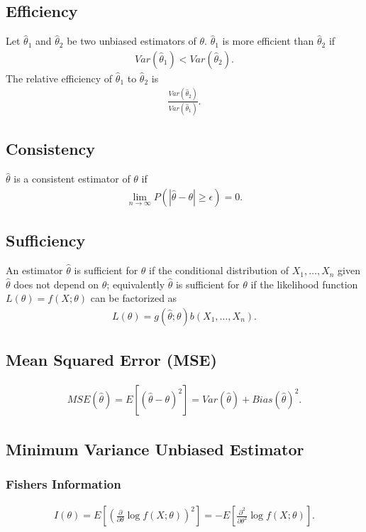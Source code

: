 \documentclass{article}
\begin{document}
\subsection{Efficiency}
Let $\hat{\theta}_1$ and $\hat{\theta}_2$ be two unbiased estimators of $\theta$. 
$\hat{\theta}_1$ is more efficient than $\hat{\theta}_2$ if
\begin{align*}
    Var(\hat{\theta}_1) < Var(\hat{\theta}_2).
\end{align*}
The relative efficiency of $\hat{\theta}_1$ to $\hat{\theta}_2$ is
\begin{align*}
    \frac{Var(\hat{\theta}_2)}{Var(\hat{\theta}_1)}.
\end{align*}

\subsection{Consistency}
$\hat{\theta}$ is a consistent estimator of $\theta$ if
\begin{align*}
    \lim_{n\rightarrow\infty}P(|\hat{\theta}-\theta|\ge\epsilon) = 0.
\end{align*}

\subsection{Sufficiency}
An estimator $\hat{\theta}$ is sufficient for $\theta$ if the conditional distribution of $X_1,\dots,X_n$ given $\hat{\theta}$ does not depend on $\theta$;
equivalently $\hat{\theta}$ is sufficient for $\theta$ if the likelihood function $L(\theta) = f(X;\theta)$ can be factorized as
\begin{align*}
    L(\theta) = g(\hat{\theta}; \theta)b(X_1, \dots, X_n).
\end{align*}

\subsection{Mean Squared Error (MSE)}
\begin{align*}
    MSE(\hat{\theta}) = E[(\hat{\theta}-\theta)^2] = Var(\hat{\theta}) + Bias(\hat{\theta})^2.
\end{align*}

\subsection{Minimum Variance Unbiased Estimator}
\subsubsection{Fishers Information}
\begin{align*}
    I(\theta) = E\left[\left(\frac{\partial}{\partial\theta}\log f(X;\theta)\right)^2\right] = -E\left[\frac{\partial^2}{\partial\theta^2}\log f(X;\theta)\right].
\end{align*}
\end{document}
